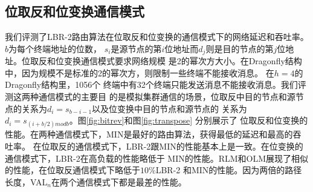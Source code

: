 \subsection{位取反和位变换通信模式}

我们评测了LBR-2路由算法在位取反和位变换的通信模式下的网络延迟和吞吐率。$b$为每个终端地址的位数，
$s_i$是源节点的第$i$位地址而$d_j$则是目的节点的第$j$位地址。位取反和位变换通信模式要求网络规模
是2的幂次方大小。在Dragonfly结构中，因为规模不是标准的2的幂次方，则限制一些终端不能接收消息。 在$h=4$的Dragonfly结构里，1056个
终端中有32个终端只能发送消息不能接收消息。我们评测这两种通信模式的主要目
的是模拟集群通信的场景，位取反中目的节点和源节点的关系为$d_i=s_{b-i-1}$以及位变换中目的节点和源节点的
关系为$d_i=s_{(i+b/2) mod b}$。图\ref{fig:bitrev}和图\ref{fig:transpose} 分别展示了
位取反和位变换的性能。在两种通信模式下，MIN是最好的路由算法，获得最低的延迟和最高的吞吐率。
在位取反的通信模式下，LBR-2跟MIN的性能基本上是一致。在位变换的通信模式下，LBR-2在高负载的性能略低于
MIN的性能。RLM和OLM展现了相似的性能，在位取反通信模式下略低于$10\%$LBR-2 和MIN的性能。因为两倍的路径
长度，VAL$_n$在两个通信模式下都是最差的性能。



  \begin{figure*}[htbp]
  \centering
  \begin{minipage}[t]{\textwidth}
  \centering
  \caption{位取反通信模式}
  \label{fig:bitrev}
   \end{minipage}
\end{figure*}


\begin{figure*}[htbp]
  \centering
  \begin{minipage}[t]{\textwidth}
  \centering
  \caption{位变换通信模式}
  \label{fig:transpose}
  \end{minipage}
  \end{figure*}



